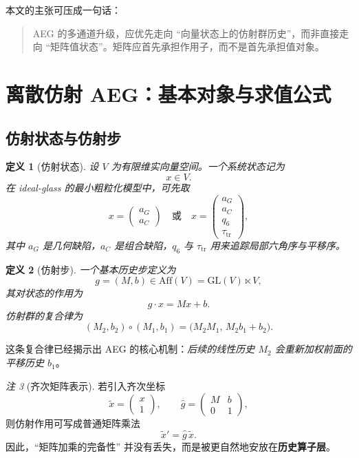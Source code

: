 \documentclass[11pt,a4paper]{ctexart}
\newtheorem{definition}{定义}[section]
\theoremstyle{remark}
\newtheorem{remark}[definition]{注}
\newcommand{\Aff}{\mathrm{Aff}}
\newcommand{\GL}{\mathrm{GL}}
\begin{document}
本文的主张可压成一句话：
\begin{quote}
AEG 的多通道升级，应优先走向 ``向量状态上的仿射群历史''，而非直接走向 ``矩阵值状态''。矩阵应首先承担作用子，而不是首先承担值对象。
\end{quote}

\section{离散仿射 AEG：基本对象与求值公式}

\subsection{仿射状态与仿射步}

\begin{definition}[仿射状态]
设 $V$ 为有限维实向量空间。一个系统状态记为
\[
x\in V.
\]
在 ideal-glass 的最小粗粒化模型中，可先取
\[
x=
\begin{pmatrix}
a_G\\ a_C
\end{pmatrix}
\quad\text{或}\quad
x=
\begin{pmatrix}
a_G\\ a_C\\ q_6\\ \tau_{\mathrm{tr}}
\end{pmatrix},
\]
其中 $a_G$ 是几何缺陷，$a_C$ 是组合缺陷，$q_6$ 与 $\tau_{\mathrm{tr}}$ 用来追踪局部六角序与平移序。
\end{definition}

\begin{definition}[仿射步]
一个基本历史步定义为
\[
g=(M,b)\in \Aff(V)=\GL(V)\ltimes V,
\]
其对状态的作用为
\[
g\cdot x=Mx+b.
\]
仿射群的复合律为
\[
(M_2,b_2)\circ(M_1,b_1)=\bigl(M_2M_1,\,M_2b_1+b_2\bigr).
\]
\end{definition}

这条复合律已经揭示出 AEG 的核心机制：\emph{后续的线性历史 $M_2$ 会重新加权前面的平移历史 $b_1$}。

\begin{remark}[齐次矩阵表示]
若引入齐次坐标
\[
\tilde x=
\begin{pmatrix}
x\\1
\end{pmatrix},
\qquad
\widehat g=
\begin{pmatrix}
M & b\\
0 & 1
\end{pmatrix},
\]
则仿射作用可写成普通矩阵乘法
\[
\tilde x' = \widehat g\,\tilde x.
\]
因此，``矩阵加乘的完备性'' 并没有丢失，而是被更自然地安放在\textbf{历史算子层}。
\end{remark}
\end{document}
